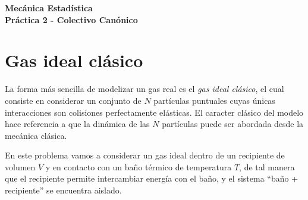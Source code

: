 \documentclass[a4paper,11pt]{article}
\begin{document}
\pagestyle{fancy}
\chead{\small \the\year}



\thispagestyle{plain}
\begin{center}
    \textbf{\large
        Mecánica Estadística \\
        Práctica 2 - Colectivo Canónico
    }
\end{center}
\vspace{-1.5em}




\section{Gas ideal clásico}
\label{sec:gas-ideal}

La forma más sencilla de modelizar un gas real es el \emph{gas ideal 
clásico}, el cual consiste en considerar un conjunto de $N$ partículas 
puntuales cuyas únicas interacciones son colisiones 
perfectamente elásticas.
El caracter clásico del modelo hace referencia a que la dinámica de 
las $N$ partículas puede ser abordada desde la mecánica clásica.

En este problema vamos a considerar un gas ideal dentro de un 
recipiente de volumen $V$ y en contacto con un baño térmico de 
temperatura $T$, de tal manera que el recipiente permite intercambiar 
energía con el baño, y el sistema ``baño + recipiente'' se encuentra 
aislado.
\end{document}
